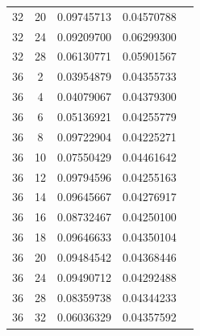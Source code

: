 \documentclass[letterpaper,12pt]{article}
\theoremstyle{remark}
\begin{document}
\begin{tabular}{ccccc}
32 & 20 & 0.09745713 & 0.04570788 \\
32 & 24 & 0.09209700 & 0.06299300 \\
32 & 28 & 0.06130771 & 0.05901567 \\
36 & 2 & 0.03954879 & 0.04355733 \\
36 & 4 & 0.04079067 & 0.04379300 \\
36 & 6 & 0.05136921 & 0.04255779 \\
36 & 8 & 0.09722904 & 0.04225271 \\
36 & 10 & 0.07550429 & 0.04461642 \\
36 & 12 & 0.09794596 & 0.04255163 \\
36 & 14 & 0.09645667 & 0.04276917 \\
36 & 16 & 0.08732467 & 0.04250100 \\
36 & 18 & 0.09646633 & 0.04350104 \\
36 & 20 & 0.09484542 & 0.04368446 \\
36 & 24 & 0.09490712 & 0.04292488 \\
36 & 28 & 0.08359738 & 0.04344233 \\
36 & 32 & 0.06036329 & 0.04357592 \\
\end{tabular}
\end{document}
